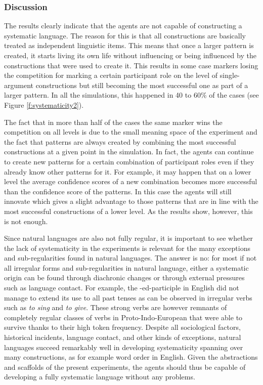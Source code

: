 \subsubsection{Discussion}
 The results clearly indicate that the agents are not capable of constructing a systematic language. The reason for this is that all constructions are basically treated as independent linguistic items. This means that once a larger pattern is created, it starts living its own life without influencing or being influenced by the constructions that were used to create it. This results in some case markers losing the competition for marking a certain participant role on the level of single-argument constructions but still becoming the most successful one as part of a larger pattern. In all the simulations, this happened in 40 to 60\% of the cases (see Figure \ref{f:systematicity2}).

The fact that in more than half of the cases the same marker wins the competition on all levels is due to the small meaning space of the experiment and the fact that patterns are always created by combining the most successful constructions at a given point in the simulation. In fact, the agents can continue to create new patterns for a certain combination of participant roles even if they already know other patterns for it. For example, it may happen that on a lower level the average confidence scores of a new combination becomes more successful than the confidence score of the patterns. In this case the agents will still innovate which gives a slight advantage to those patterns that are in line with the most successful constructions of a lower level. As the results show, however, this is not enough.

Since natural languages are also not fully regular, it is important to see whether the lack of systematicity in the experiments is relevant for the many exceptions and sub-regularities found in natural languages. The answer is no: for most if not all irregular forms and sub-regularities in natural language, either a systematic origin can be found through diachronic changes or through external pressures such as language contact. For example, the -ed-participle in English did not manage to extend its use to all past tenses as can be observed in irregular verbs such as {\em to sing} and {\em to give}. These strong verbs are however remnants of completely regular classes of verbs in Proto-Indo-European that were able to survive thanks to their high token frequency. Despite all sociological factors, historical incidents, language contact, and other kinds of exceptions, natural languages succeed remarkably well in developing systematicity spanning over many constructions, as for example word order in English. Given the abstractions and scaffolds of the present experiments, the agents should thus be capable of developing a fully systematic language without any problems.

